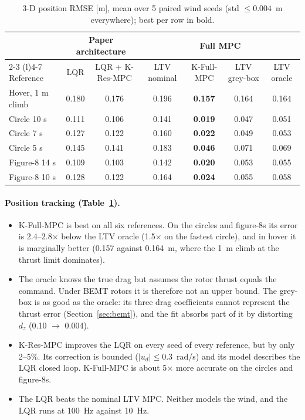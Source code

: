 \documentclass[11pt,a4paper]{article}
\newcommand{\KResMPC}{\textsf{K-Res-MPC}}     %
\newcommand{\KFullMPC}{\textsf{K-Full-MPC}}   %
\begin{document}
	\begin{table}[ht]
		\centering
		\caption{3-D position RMSE [m], mean over 5 paired wind seeds (std $\le 0.004$~m everywhere);
			best per row in bold.}
		\label{tab:six-controllers}
		\small
		\setlength{\tabcolsep}{3.5pt}
		\begin{tabular}{@{}lcccccc@{}}
			\toprule
			& \multicolumn{2}{c}{Paper architecture} & \multicolumn{4}{c}{Full MPC} \\
			\cmidrule(lr){2-3} \cmidrule(l){4-7}
			Reference & LQR & LQR + \KResMPC{} & LTV nominal & \KFullMPC{} & LTV grey-box & LTV oracle \\
			\midrule
			Hover, 1 m climb & 0.180 & 0.176 & 0.196 & \textbf{0.157} & 0.164 & 0.164 \\
			Circle 10 s & 0.111 & 0.106 & 0.141 & \textbf{0.019} & 0.047 & 0.051 \\
			Circle 7 s & 0.127 & 0.122 & 0.160 & \textbf{0.022} & 0.049 & 0.053 \\
			Circle 5 s & 0.145 & 0.141 & 0.183 & \textbf{0.046} & 0.071 & 0.069 \\
			Figure-8 14 s & 0.109 & 0.103 & 0.142 & \textbf{0.020} & 0.053 & 0.055 \\
			Figure-8 10 s & 0.128 & 0.122 & 0.164 & \textbf{0.024} & 0.055 & 0.058 \\
			\bottomrule
		\end{tabular}
	\end{table}

	\paragraph{Position tracking (Table~\ref{tab:six-controllers}).}
	\begin{itemize}[leftmargin=*]
		\item \KFullMPC{} is best on all six references. On the circles and figure-8s its error is
		2.4--2.8$\times$ below the LTV oracle (1.5$\times$ on the fastest circle), and in hover it is
		marginally better (0.157 against 0.164~m, where the 1~m climb at the thrust limit dominates).
		\item The oracle knows the true drag but assumes the rotor thrust equals the command. Under BEMT
		rotors it is therefore not an upper bound. The grey-box is as good as the oracle: its three
		drag coefficients cannot represent the thrust error (Section~\ref{sec:bemt}), and the fit
		absorbs part of it by distorting $d_z$ (0.10 $\to$ 0.004).
		\item \KResMPC{} improves the LQR on every seed of every reference, but by only 2--5\%.
		Its correction is bounded ($|u_d| \le 0.3$~rad/s) and its model describes the LQR closed loop.
		\KFullMPC{} is about 5$\times$ more accurate on the circles and figure-8s.
		\item The LQR beats the nominal LTV MPC. Neither models the wind, and the LQR runs at 100~Hz
		against 10~Hz.
	\end{itemize}
\end{document}
